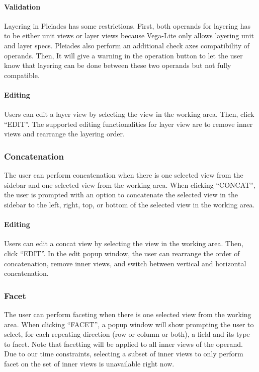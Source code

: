 \documentclass[journal]{vgtc}                %
\begin{document}
\paragraph{Validation} Layering in Pleiades has some restrictions. First, both
operands for layering has to be either unit views or layer views because
Vega-Lite only allows layering unit and layer specs. Pleiades also perform an
additional check axes compatibility of operands. Then, It will give a warning
in the operation button to let the user know that layering can be done between
these two operands but not fully compatible.

\paragraph{Editing} Users can edit a layer view by selecting the view in the
working area. Then, click “EDIT”. The supported editing functionalities for layer
view are to remove inner views and rearrange the layering order.

\subsubsection{Concatenation}
The user can perform concatenation when there is one selected view from the sidebar
and one selected view from the working area. When clicking “CONCAT”, the user is
prompted with an option to concatenate the selected view in the sidebar to the
left, right, top, or bottom of the selected view in the working area.

\paragraph{Editing} Users can edit a concat view by selecting the view in the
working area. Then, click “EDIT”. In the edit popup window, the user can rearrange
the order of concatenation, remove inner views, and switch between vertical and
horizontal concatenation.

\subsubsection{Facet}
The user can perform faceting when there is one selected view from the working
area. When clicking “FACET”, a popup window will show prompting the user to select,
for each repeating direction (row or column or both), a field and its type to facet.
Note that facetting will be applied to all inner views of the operand. Due to our time
constraints, selecting a subset of inner views to only perform facet on the set of
inner views is unavailable right now.
\end{document}
